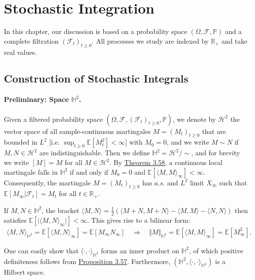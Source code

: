\documentclass{article}
\numberwithin{equation}{section}
\newcommand{\E}{\mathbb{E}}
\renewcommand{\P}{\mathbb{P}}
\theoremstyle{plain}
\theoremstyle{definition}
\begin{document}
\section{Stochastic Integration}
In this chapter, our discussion is based on a probability space $(\Omega,\mathscr{F},\P)$ and a complete filtration $(\mathscr{F}_t)_{t\geq 0}$. All processes we study are indexed by $\mathbb{R}_+$ and take real values. 
\subsection{Construction of Stochastic Integrals}
\paragraph{Preliminary: Space $\mathbb{H}^2$.} Given a filtered probability space $(\Omega,\mathscr{F},(\mathscr{F}_t)_{t\geq 0},\P)$, we denote by $\mathcal{H}^2$ the vector space of all sample-continuous martingales $M=(M_t)_{t\geq 0}$ that are bounded in $L^2$ [i.e. $\sup_{t\geq 0}\E[M_t^2]<\infty$] with $M_0=0$, and we write $M\sim N$ if $M,N\in\mathcal{H}^2$ are indistinguishable. Then we define $\mathbb{H}^2=\mathcal{H}^2/\sim$, and for brevity we write $[M]=M$ for all $M\in\mathcal{H}^2$. By \hyperref[thm:3.58]{Theorem 3.58}, a continuous local martingale falls in $\mathbb{H}^2$ if and only if $M_0=0$ and $\E\left[\langle M,M\rangle_\infty\right]<\infty$. Consequently, the martingale $M=(M_t)_{t\geq 0}$ has $a.s.$ and $L^2$ limit $X_\infty$ such that $\E[M_\infty|\mathscr{F}_t]=M_t$ for all $t\in\mathbb{R}_+$.

If $M,N\in\mathbb{H}^2$, the bracket $\langle M,N\rangle=\frac{1}{2}(\langle M+N,M+N\rangle-\langle M,M\rangle-\langle N,N\rangle)$ then satisfies $\E[\vert\langle M,N\rangle_\infty\vert]<\infty$. This gives rise to a bilinear form:
\begin{align*}
	\langle M,N\rangle_{\mathbb{H}^2}=\E\left[\langle M,N\rangle_\infty\right]=\E[M_\infty N_\infty]\quad\Rightarrow\quad \Vert M\Vert_{\mathbb{H}^2}=\E[\langle M,M\rangle_\infty]=\E[M_\infty^2].
\end{align*}

One can easily show that $\langle\cdot,\cdot\rangle_{\mathbb{H}^2}$ forms an inner product on $\mathbb{H}^2$, of which positive definiteness follows from \hyperref[prop:3.57]{Proposition 3.57}. Furthermore, $(\mathbb{H}^2,\langle\cdot,\cdot\rangle_{\mathbb{H}^2})$ is a Hilbert space.
\end{document}
